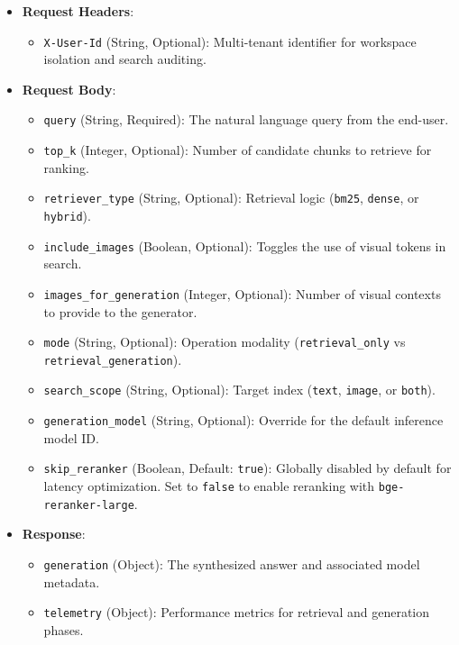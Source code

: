 \begin{itemize}
    \item \textbf{Request Headers}:
    \begin{itemize}
        \item \texttt{X-User-Id} (String, Optional): Multi-tenant identifier for workspace isolation and search auditing.
    \end{itemize}
    \item \textbf{Request Body}:
    \begin{itemize}
        \item \texttt{query} (String, Required): The natural language query from the end-user.
        \item \texttt{top\_k} (Integer, Optional): Number of candidate chunks to retrieve for ranking.
        \item \texttt{retriever\_type} (String, Optional): Retrieval logic (\texttt{bm25}, \texttt{dense}, or \texttt{hybrid}).
        \item \texttt{include\_images} (Boolean, Optional): Toggles the use of visual tokens in search.
        \item \texttt{images\_for\_generation} (Integer, Optional): Number of visual contexts to provide to the generator.
        \item \texttt{mode} (String, Optional): Operation modality (\texttt{retrieval\_only} vs \texttt{retrieval\_generation}).
        \item \texttt{search\_scope} (String, Optional): Target index (\texttt{text}, \texttt{image}, or \texttt{both}).
        \item \texttt{generation\_model} (String, Optional): Override for the default inference model ID.
        \item \texttt{skip\_reranker} (Boolean, Default: \texttt{true}): Globally disabled by default for latency optimization. Set to \texttt{false} to enable reranking with \texttt{bge-reranker-large}.
    \end{itemize}
    \item \textbf{Response}:
    \begin{itemize}
        \item \texttt{generation} (Object): The synthesized answer and associated model metadata.
        \item \texttt{telemetry} (Object): Performance metrics for retrieval and generation phases.
    \end{itemize}
\end{itemize}

